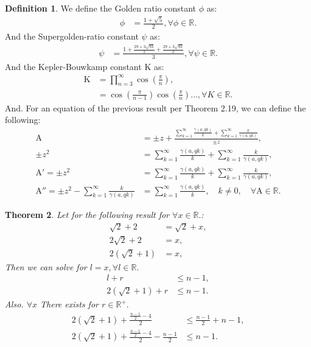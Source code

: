 \documentclass[10pt]{article}
\theoremstyle{plain}
\newtheorem{theorem}{Theorem}[section]
\theoremstyle{definition}
\newtheorem{definition}[theorem]{Definition}
\theoremstyle{remark}
\begin{document}
\begin{definition}
	We define the Golden ratio constant $\phi$ as:
	\begin{align*}
		\phi &= \frac{1+\sqrt{5}}{2}, \forall \phi \in \mathbb{R}.
	\end{align*}
	And the Supergolden-ratio constant $\psi$ as:
	\begin{align*}
		\psi &= \frac{1+\frac{29+3\sqrt{93}}{2}+\frac{29+3\sqrt{93}}{2}}{3}, \forall \psi \in \mathbb{R}.
	\end{align*}
	And the Kepler-Bouwkamp constant $\mathrm{K}$ as:
	\begin{align*}
		\mathrm{K} &= \prod_{n=3}^{\infty} \cos(\frac{\pi}{n}),\\
		&= \cos(\frac{\pi}{n-1}) \cos(\frac{\pi}{n}) \dots, \forall K \in \mathbb{R}.
	\end{align*}
	And. For an equation of the previous result per Theorem 2.19, we can define the following:
	\begin{align*}
		\mathrm{A} &= \pm z + \frac{\sum_{k=1}^{\infty} \frac{\gamma(a, qk)}{k} + \sum_{k=1}^{\infty}\frac{k}{\gamma(a, qk)}}{\pm z},\\
		\pm z^2 &= \sum_{k=1}^{\infty} \frac{\gamma(a, qk)}{k} + \sum_{k=1}^{\infty}\frac{k}{\gamma(a, qk)},\\
		\mathrm{A}' = \pm z^2 &= \sum_{k=1}^{\infty} \frac{\gamma(a, qk)}{k} + \sum_{k=1}^{\infty}\frac{k}{\gamma(a, qk)},\\
		\mathrm{A}'' = \pm z^{2} - \sum_{k=1}^{\infty}\frac{k}{\gamma(a, qk)} &= \sum_{k=1}^{\infty} \frac{\gamma(a, qk)}{k}, \quad k \neq 0, \quad \forall \mathrm{A} \in \mathbb{R}.
	\end{align*}
\end{definition}

\begin{theorem}
	Let for the following result for $\forall x \in \mathbb{R}.$:
	\begin{align*}
		\sqrt{2}+2&=\sqrt{2} + x,\\
		2\sqrt{2}+2 &=x,\\
		2(\sqrt{2} + 1) &= x,
	\end{align*}
	Then we can solve for $l=x, \forall l \in \mathbb{R}.$
	\begin{align*}
		l + r &\leq n - 1,\\
		2(\sqrt{2} + 1) + r &\leq n - 1.
	\end{align*}
	Also. $\forall x$ There exists for $r \in \mathbb{R}^{+}.$
	\begin{align*}
		2(\sqrt{2} + 1) + \frac{\frac{n - 1}{2} - 4}{2}  &\leq \frac{n - 1}{2} + n - 1,\\
		2(\sqrt{2} + 1) + \frac{\frac{n - 1}{2} - 4}{2} - \frac{n - 1}{2} &\leq n - 1.
	\end{align*}
\end{theorem}
\end{document}
